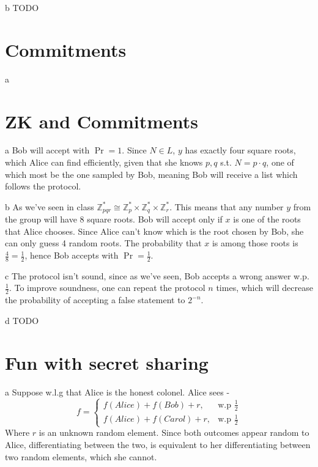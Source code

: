 \documentclass{article}
\begin{document}
\begin{paragraph}
    b TODO
\end{paragraph}

\section{Commitments}
\quad a

\section{ZK and Commitments}
\begin{paragraph}
    a Bob will accept with $\Pr = 1$. Since $N \in L$, $y$ has exactly four square roots, which
    Alice can find efficiently, given that she knows $p,q$ s.t. $N = p\cdot q$, one
    of which most be the one sampled by Bob, meaning Bob will receive a list which follows
    the protocol.
\end{paragraph}

\begin{paragraph}
    b As we've seen in class $\mathbb{Z}^*_{pqr} \cong \mathbb{Z}^*_p \times \mathbb{Z}^*_q \times \mathbb{Z}^*_r$.
    This means that any number $y$ from the group will have 8 square roots.
    Bob will accept only if $x$ is one of the roots that Alice chooses. Since Alice can't
    know which is the root chosen by Bob, she can only guess 4 random roots.
    The probability that $x$ is among those roots is $\frac{4}{8} = \frac{1}{2}$, hence
    Bob accepts with $\Pr = \frac{1}{2}$.
\end{paragraph}

\begin{paragraph}
    c The protocol isn't sound, since as we've seen, Bob accepts a wrong answer w.p. $\frac{1}{2}$.
    To improve soundness, one can repeat the protocol $n$ times, which will decrease the probability
    of accepting a false statement to $2^{-n}$.
\end{paragraph}

\begin{paragraph}
    d TODO
\end{paragraph}

\section{Fun with secret sharing}
\begin{paragraph}
    a Suppose w.l.g that Alice is the honest colonel. Alice sees - 
    \begin{equation*}
    f =
        \begin{cases}
            f(Alice) + f(Bob) + r, & \mbox{w.p } \frac{1}{2} \\
            f(Alice) + f(Carol) + r, & \mbox{w.p } \frac{1}{2}
        \end{cases}
    \end{equation*}
    Where $r$ is an unknown random element. Since both outcomes appear random to Alice,
    differentiating between the two, is equivalent to her differentiating between two random elements,
    which she cannot.
\end{paragraph}
\end{document}
